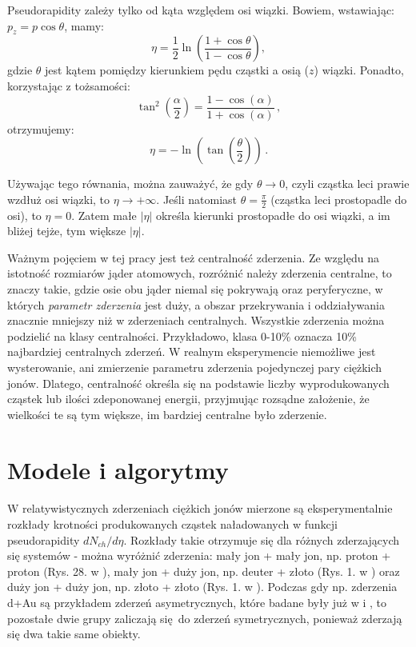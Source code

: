 \documentclass[a4paper,12pt]{article}
\begin{document}
Pseudorapidity zależy tylko od kąta względem osi wiązki. Bowiem, wstawiając: $p_z = p \cos\theta$, mamy:
\begin{equation} \label{eq:pseudo1}
 \eta = \frac{1}{2} \ln \left( \frac{1 + \cos\theta}{1 - \cos\theta} \right) ,
 \end{equation}
gdzie $\theta$ jest kątem pomiędzy kierunkiem pędu cząstki a osią ($z$) wiązki. Ponadto, korzystając \quad z tożsamości:
\begin{equation} \label{eq:tansq}
 \tan^2 \left( \frac{\alpha}{2}  \right) = \frac{1 - \cos(\alpha)}{1 + \cos(\alpha)}\,,
 \end{equation}
otrzymujemy:
\begin{equation} \label{eq:pseudorap2}
\eta = - \ln \left( \tan \left( \frac{\theta}{2} \right) \right)\,.
\end{equation}

Używając tego równania, można zauważyć, że gdy $\theta \to 0$, czyli cząstka leci prawie wzdłuż osi wiązki, to $\eta \to + \infty$. Jeśli natomiast $\theta = \frac{\pi}{2}$ (cząstka leci prostopadle do osi), to $\eta = 0$.
Zatem małe $|\eta|$ określa kierunki prostopadłe do osi wiązki, a im bliżej tejże, tym większe $|\eta|$.

Ważnym pojęciem w tej pracy jest też centralność zderzenia. Ze względu na istotność rozmiarów jąder atomowych, rozróżnić należy zderzenia centralne, to znaczy takie, gdzie osie obu jąder niemal się pokrywają oraz peryferyczne, w których \textit{parametr zderzenia} jest duży, a obszar przekrywania i oddziaływania znacznie mniejszy niż w zderzeniach centralnych. Wszystkie zderzenia można podzielić na klasy centralności. Przykładowo, klasa 0-10\% oznacza 10\% najbardziej centralnych zderzeń. W realnym eksperymencie niemożliwe jest wysterowanie, ani zmierzenie parametru zderzenia pojedynczej pary ciężkich jonów. Dlatego, centralność określa się na podstawie liczby wyprodukowanych cząstek lub ilości zdeponowanej energii, przyjmując rozsądne założenie, że wielkości te są tym większe, im bardziej centralne było zderzenie.


\newpage
\section{Modele i algorytmy}
\paragraph{}
W relatywistycznych zderzeniach ciężkich jonów mierzone są eksperymentalnie rozkłady krotności produkowanych cząstek naładowanych w funkcji pseudorapidity $dN_{ch}/d\eta$. Rozkłady takie otrzymuje się dla różnych zderzających się systemów - można wyróżnić zderzenia: mały jon + mały jon, np. proton + proton (Rys. 28. w \cite{Alver:2010ck}), mały jon + duży jon, np. deuter + złoto (Rys. 1. w \cite{Back:2004mr}) oraz duży jon + duży jon, np. złoto + złoto (Rys. 1. w \cite{Back:2002wb}). Podczas gdy np. zderzenia d+Au są przykładem zderzeń asymetrycznych, które badane były już w \cite{Barej:pracaInz18} i \cite{Barej:2017kcw}, to pozostałe dwie grupy zaliczają się do zderzeń symetrycznych, ponieważ zderzają się dwa takie same obiekty.
\end{document}
